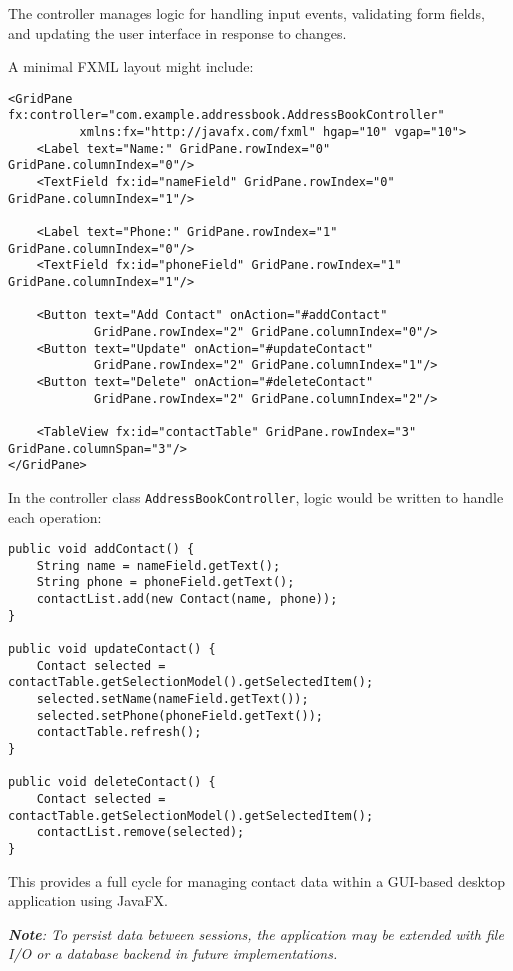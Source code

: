 \documentclass{article}
\newcommand{\codecmd}[1]{\textcolor[rgb]{0,0.5,0}{\texttt{#1}}}
\begin{document}
The controller manages logic for handling input events, validating form fields, and updating the user interface in response to changes.

A minimal FXML layout might include:

\begin{verbatim}
<GridPane fx:controller="com.example.addressbook.AddressBookController"
          xmlns:fx="http://javafx.com/fxml" hgap="10" vgap="10">
    <Label text="Name:" GridPane.rowIndex="0" GridPane.columnIndex="0"/>
    <TextField fx:id="nameField" GridPane.rowIndex="0" GridPane.columnIndex="1"/>

    <Label text="Phone:" GridPane.rowIndex="1" GridPane.columnIndex="0"/>
    <TextField fx:id="phoneField" GridPane.rowIndex="1" GridPane.columnIndex="1"/>

    <Button text="Add Contact" onAction="#addContact"
            GridPane.rowIndex="2" GridPane.columnIndex="0"/>
    <Button text="Update" onAction="#updateContact"
            GridPane.rowIndex="2" GridPane.columnIndex="1"/>
    <Button text="Delete" onAction="#deleteContact"
            GridPane.rowIndex="2" GridPane.columnIndex="2"/>

    <TableView fx:id="contactTable" GridPane.rowIndex="3" GridPane.columnSpan="3"/>
</GridPane>
\end{verbatim}

In the controller class \codecmd{AddressBookController}, logic would be written to handle each operation:

\begin{verbatim}
public void addContact() {
    String name = nameField.getText();
    String phone = phoneField.getText();
    contactList.add(new Contact(name, phone));
}

public void updateContact() {
    Contact selected = contactTable.getSelectionModel().getSelectedItem();
    selected.setName(nameField.getText());
    selected.setPhone(phoneField.getText());
    contactTable.refresh();
}

public void deleteContact() {
    Contact selected = contactTable.getSelectionModel().getSelectedItem();
    contactList.remove(selected);
}
\end{verbatim}

\noindent This provides a full cycle for managing contact data within a GUI-based desktop application using JavaFX.

\medskip
\textit{\textbf{Note}: To persist data between sessions, the application may be extended with file I/O or a database backend in future implementations.}
\end{document}
